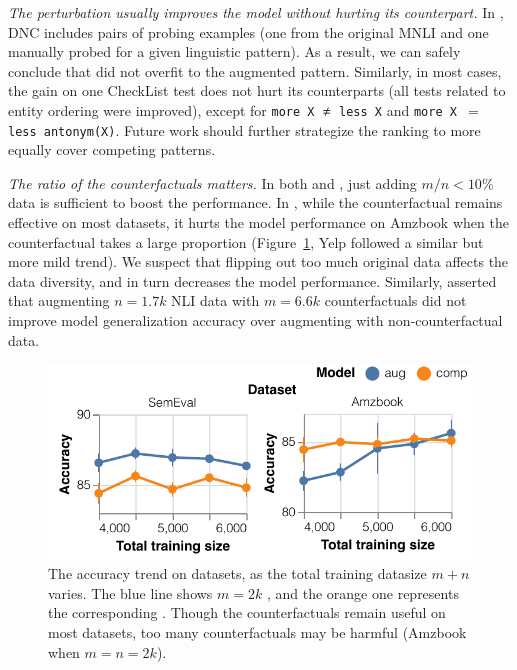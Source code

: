 \emph{The perturbation usually improves the model without hurting its counterpart.}
In \nli, DNC includes pairs of probing examples (one from the original MNLI and one manually probed for a given linguistic pattern).
As a result, we can safely conclude that \nli did not overfit to the augmented pattern.
Similarly, in most \qqp cases, the gain on one CheckList test does not hurt its counterparts (\eg all tests related to entity ordering were improved), except for \texttt{more X $\not\eq$ less X} and \texttt{more X $=$ less antonym(X)}.
Future work should further strategize the ranking to more equally cover competing patterns. 

\emph{The ratio of the counterfactuals matters. }
In both \nli and \qqp, just adding $m/n < 10\%$ data is sufficient to boost the performance.
In \sst, while the counterfactual remains effective on most datasets, it hurts the model performance on Amzbook when the counterfactual takes a large proportion (Figure~\ref{fig:sst_trend}, Yelp followed a similar but more mild trend).
We suspect that flipping out too much original data affects the data diversity, and in turn decreases the model performance.
Similarly, \citet{huang2020counterfactually} asserted that augmenting $n=1.7k$ NLI data with $m=6.6k$ counterfactuals did not improve model generalization accuracy over augmenting with non-counterfactual data.




\begin{figure}[t]
\centering
\includegraphics[width=1\columnwidth]{figures/sst_trend_2}
\vspace{-15pt}
\caption{The accuracy trend on \sst datasets, as the total training datasize $m+n$ varies. The blue line shows $m=2k$ \maug, and the orange one represents the corresponding \mcomp.
Though the counterfactuals remain useful on most datasets, too many counterfactuals may be harmful (\eg Amzbook when $m=n=2k$).
}
\vspace{-10pt}
\label{fig:sst_trend}
\end{figure}





